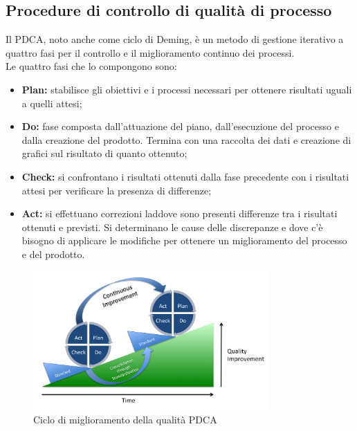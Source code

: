 	\subsection{Procedure di controllo di qualità di processo}
	Il PDCA, noto anche come ciclo di Deming, è un metodo di gestione iterativo a quattro fasi per il controllo e il miglioramento continuo dei processi.\\
	Le quattro fasi che lo compongono sono:
		\begin{itemize}
			\item \textbf{Plan:} stabilisce gli obiettivi e i processi necessari per ottenere risultati uguali a quelli attesi;
			\item \textbf{Do:} fase composta dall'attuazione del piano, dall'esecuzione del processo e dalla creazione del prodotto. Termina con una raccolta dei dati e creazione di grafici sul risultato di quanto ottenuto;
			\item \textbf{Check:} si confrontano i risultati ottenuti dalla fase precedente con i risultati attesi per verificare la presenza di differenze;
			\item \textbf{Act:} si effettuano correzioni laddove sono presenti differenze tra i risultati ottenuti e previsti. Si determinano le cause delle discrepanze e dove c'è bisogno di applicare le modifiche per ottenere un miglioramento del processo e del prodotto.
		\end{itemize}
		\begin{figure}[h]
			\centering
			\includegraphics[width=90mm]{images/pdca.png}
			\caption{Ciclo di miglioramento della qualità PDCA}
		\end{figure}
	
